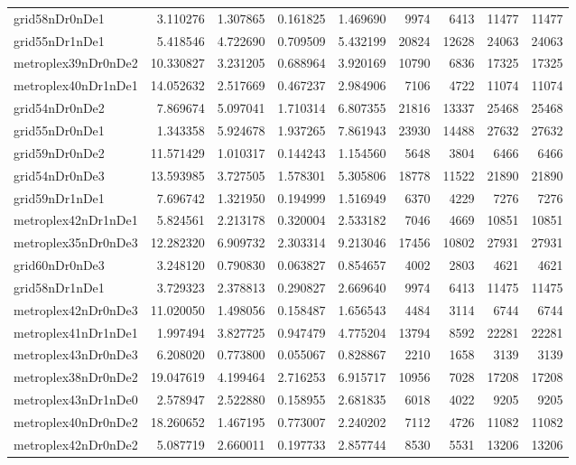 \begin{longtable}{|l|r|r|r|r|r|r|r|r|}
grid58nDr0nDe1 & 3.110276 & 1.307865 & 0.161825 & 1.469690 & 9974 & 6413 & 11477 & 11477 \\
grid55nDr1nDe1 & 5.418546 & 4.722690 & 0.709509 & 5.432199 & 20824 & 12628 & 24063 & 24063 \\
metroplex39nDr0nDe2 & 10.330827 & 3.231205 & 0.688964 & 3.920169 & 10790 & 6836 & 17325 & 17325 \\
metroplex40nDr1nDe1 & 14.052632 & 2.517669 & 0.467237 & 2.984906 & 7106 & 4722 & 11074 & 11074 \\
grid54nDr0nDe2 & 7.869674 & 5.097041 & 1.710314 & 6.807355 & 21816 & 13337 & 25468 & 25468 \\
grid55nDr0nDe1 & 1.343358 & 5.924678 & 1.937265 & 7.861943 & 23930 & 14488 & 27632 & 27632 \\
grid59nDr0nDe2 & 11.571429 & 1.010317 & 0.144243 & 1.154560 & 5648 & 3804 & 6466 & 6466 \\
grid54nDr0nDe3 & 13.593985 & 3.727505 & 1.578301 & 5.305806 & 18778 & 11522 & 21890 & 21890 \\
grid59nDr1nDe1 & 7.696742 & 1.321950 & 0.194999 & 1.516949 & 6370 & 4229 & 7276 & 7276 \\
metroplex42nDr1nDe1 & 5.824561 & 2.213178 & 0.320004 & 2.533182 & 7046 & 4669 & 10851 & 10851 \\
metroplex35nDr0nDe3 & 12.282320 & 6.909732 & 2.303314 & 9.213046 & 17456 & 10802 & 27931 & 27931 \\
grid60nDr0nDe3 & 3.248120 & 0.790830 & 0.063827 & 0.854657 & 4002 & 2803 & 4621 & 4621 \\
grid58nDr1nDe1 & 3.729323 & 2.378813 & 0.290827 & 2.669640 & 9974 & 6413 & 11475 & 11475 \\
metroplex42nDr0nDe3 & 11.020050 & 1.498056 & 0.158487 & 1.656543 & 4484 & 3114 & 6744 & 6744 \\
metroplex41nDr1nDe1 & 1.997494 & 3.827725 & 0.947479 & 4.775204 & 13794 & 8592 & 22281 & 22281 \\
metroplex43nDr0nDe3 & 6.208020 & 0.773800 & 0.055067 & 0.828867 & 2210 & 1658 & 3139 & 3139 \\
metroplex38nDr0nDe2 & 19.047619 & 4.199464 & 2.716253 & 6.915717 & 10956 & 7028 & 17208 & 17208 \\
metroplex43nDr1nDe0 & 2.578947 & 2.522880 & 0.158955 & 2.681835 & 6018 & 4022 & 9205 & 9205 \\
metroplex40nDr0nDe2 & 18.260652 & 1.467195 & 0.773007 & 2.240202 & 7112 & 4726 & 11082 & 11082 \\
metroplex42nDr0nDe2 & 5.087719 & 2.660011 & 0.197733 & 2.857744 & 8530 & 5531 & 13206 & 13206 \\

\end{longtable}

